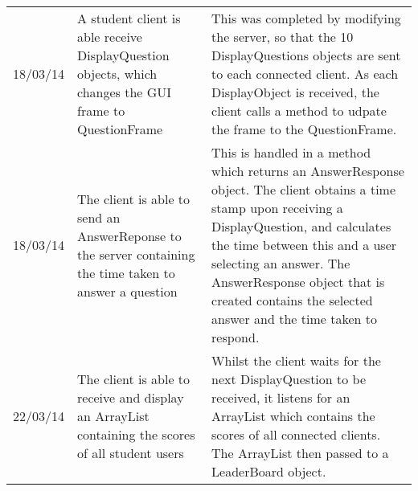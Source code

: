 \begin{longtabu}{l X X}
	18/03/14	&A student client is able receive DisplayQuestion objects, which changes the GUI frame to QuestionFrame	&This was completed by modifying the server, so that the 10 DisplayQuestions objects are sent to each connected client. As each DisplayObject is received, the client calls a method to udpate the frame to the QuestionFrame.\\
	18/03/14	&The client is able to send an AnswerReponse to the server  containing the time taken to answer a question	&This is handled in a method which returns an AnswerResponse object. The client obtains a time stamp upon receiving a DisplayQuestion, and calculates the time between this and a user selecting an answer. The AnswerResponse object that is created contains the selected answer and the time taken to respond.\\
	22/03/14	&The client is able to receive and display an ArrayList containing the scores of all student users	&Whilst the client waits for the next DisplayQuestion to be received, it listens for an ArrayList which contains the scores of all connected clients. The ArrayList then passed to a LeaderBoard object.\\
	\bottomrule
\end{longtabu}
